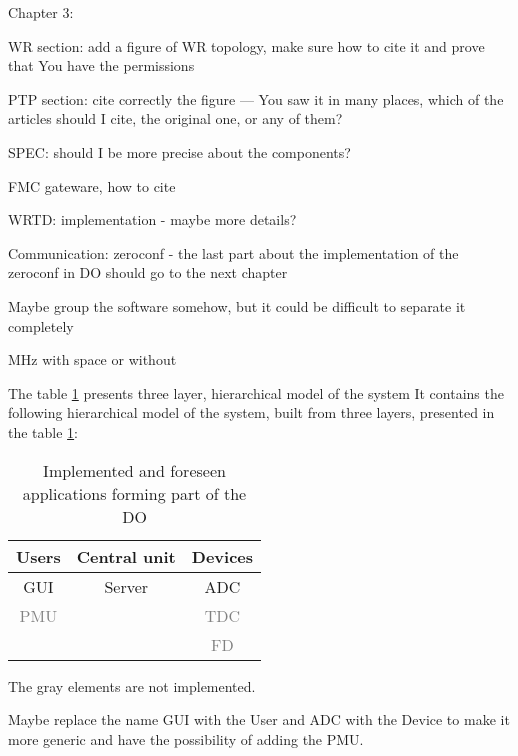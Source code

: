 Chapter 3:

WR section:
add a figure of WR topology, make sure how to cite it and prove that You have the permissions

PTP section:
cite correctly the figure --- You saw it in many places, which of the articles should I cite, the original one, or any of them?

SPEC:
should I be more precise about the components?


FMC gateware, how to cite

WRTD:
implementation - maybe more details?

Communication:
zeroconf - the last part about the implementation of the zeroconf in DO should go to the next chapter

Maybe group the software somehow, but it could be difficult to separate it completely


MHz with space or without

The table \ref{tab:server:oscilloscope_model} presents three layer, hierarchical model of the system
It contains the following hierarchical model of the system, built from three layers, presented in the table \ref{tab:server:oscilloscope_model}:
\begin{table}
\centering
\caption{Implemented and foreseen applications forming part of the DO}
\begin{tabular}{ccc}
Users & Central unit  & Devices \\
\hline
GUI & Server & ADC \\
\textcolor{gray}{PMU} &   & \textcolor{gray}{TDC} \\
 &  & \textcolor{gray}{FD} \\
\end{tabular}
\begin{tablenotes}
  \item The gray elements are not implemented.
  \end{tablenotes}
\label{tab:server:oscilloscope_model}
\end{table}

Maybe replace the name GUI with the User and ADC with the Device to make it more generic and have the possibility of adding the PMU.